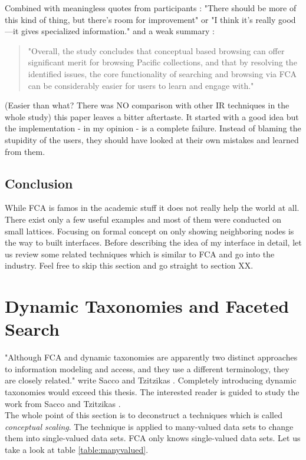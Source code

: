 \documentclass[11pt]{report}
\begin{document}
  Combined with meaningless quotes from participants \cite{Eklund2012} : "There should be more of this kind of thing, but there’s room for improvement" or "I think it’s really good—it gives specialized information." and a weak summary \cite{Eklund2012}:
  \begin{quote}
  "Overall, the study concludes that conceptual based browsing can offer significant merit for browsing Pacific collections, and that by resolving the identified issues, the core functionality of searching and browsing via FCA can be considerably easier for users to learn and engage with." 
  \end{quote}
  (Easier than what? There was NO comparison with other IR techniques in the whole study) this paper leaves a bitter aftertaste. It started with a good idea but the implementation - in my opinion - is a complete failure. Instead of blaming the stupidity of the users, they should have looked at their own mistakes and learned from them.\\
 
\subsection{Conclusion}

While FCA is famos in the academic stuff it does not really help the world at all. There exist only a few useful examples and most of them were conducted on small lattices. Focusing on formal concept on only showing neighboring nodes is the way to built interfaces. Before describing the idea of my interface in detail, let us review some related techniques which is similar to FCA and go into the industry. Feel free to skip this section and go straight to section XX.

\section{Dynamic Taxonomies and Faceted Search}
\label{dyafs}

"Although FCA and dynamic taxonomies are apparently two distinct approaches to information modeling and access, and they use a different terminology, they are closely related." write Sacco and Tzitzikas \cite{Sacco2009}. Completely introducing dynamic taxonomies would exceed this thesis. The interested reader is guided to study the work from Sacco and Tzitzikas \cite{Sacco2009}. \\

 The whole point of this section is to deconstruct a techniques which is called \textit{conceptual scaling}\cite{carpineto2004concept}. The technique is applied to many-valued data sets to change them into single-valued data sets. FCA only knows single-valued data sets. Let us take a look at table \ref{table:manyvalued}. \\
\end{document}
